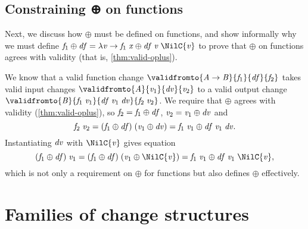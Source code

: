 \subsection{Constraining ⊕ on functions}
\label{sec:oplus-fun-intro}
Next, we discuss how \ensuremath{\oplus } must be defined on functions, and
show informally why we must define \ensuremath{\Varid{f}_{1}\oplus \Varid{df}\mathrel{=}\lambda \Varid{v}\to \Varid{f}_{1}\;\Varid{x}\oplus \Varid{df}\;\Varid{v}\;\NilC{\Varid{v}}} to prove that \ensuremath{\oplus } on functions agrees
with validity (that is, \cref{thm:valid-oplus}).

We know that a valid function change \ensuremath{\validfromto{\Conid{A}\to \Conid{B}}{\Varid{f}_{1}}{\Varid{df}}{\Varid{f}_{2}}} takes valid input changes \ensuremath{\validfromto{\Conid{A}}{\Varid{v}_{1}}{\Varid{dv}}{\Varid{v}_{2}}} to a valid
output change \ensuremath{\validfromto{\Conid{B}}{\Varid{f}_{1}\;\Varid{v}_{1}}{\Varid{df}\;\Varid{v}_{1}\;\Varid{dv}}{\Varid{f}_{2}\;\Varid{v}_{2}}}. We require
that \ensuremath{\oplus } agrees with validity (\cref{thm:valid-oplus}), so
\ensuremath{\Varid{f}_{2}\mathrel{=}\Varid{f}_{1}\oplus \Varid{df}}, \ensuremath{\Varid{v}_{2}\mathrel{=}\Varid{v}_{1}\oplus \Varid{dv}} and
%
\begin{equation}
  \label{eq:fun-preserv-eq}
\mathit{f}_{2}\;\mathit{v}_{2}\mathrel{=}(\mathit{f}_{1}\oplus \mathit{df})\;(\mathit{v}_{1}\oplus \mathit{dv})\mathrel{=}\mathit{f}_{1}\;\mathit{v}_{1}\oplus \mathit{df}\;\mathit{v}_{1}\;\mathit{dv}.
\end{equation}
%
Instantiating \ensuremath{\Varid{dv}} with \ensuremath{\NilC{\Varid{v}}} gives equation
%
\[\ensuremath{(\Varid{f}_{1}\oplus \Varid{df})\;\Varid{v}_{1}\mathrel{=}(\Varid{f}_{1}\oplus \Varid{df})\;(\Varid{v}_{1}\oplus \NilC{\Varid{v}})\mathrel{=}\Varid{f}_{1}\;\Varid{v}_{1}\oplus \Varid{df}\;\Varid{v}_{1}\;\NilC{\Varid{v}}},\]
%
which is not only a requirement on \ensuremath{\oplus } for functions but
also defines \ensuremath{\oplus } effectively.

\section{Families of change structures}
\label{sec:chs-fun-chs}

